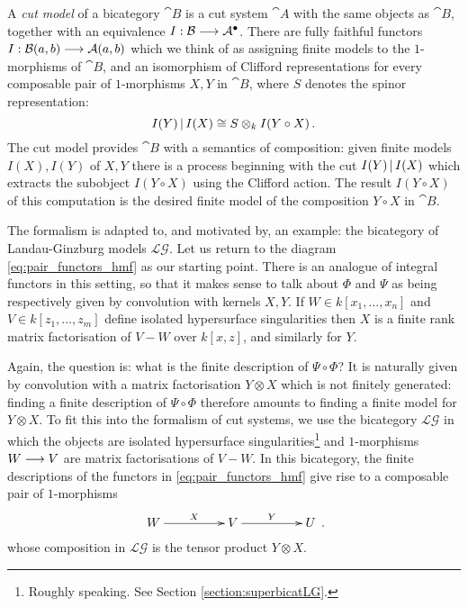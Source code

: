 \documentclass[english,letter paper,12pt,leqno]{article}
\theoremstyle{example}
\numberwithin{equation}{section}
\def\LG{\mathcal{LG}}
\begin{document}
A \emph{cut model} of a bicategory $\cat{B}$ is a cut system $\cat{A}$ with the same objects as $\cat{B}$, together with an equivalence $I: \mathcal{B} \longrightarrow \mathcal{A}^\bullet$. There are fully faithful functors $I: \mathcal{B}(a,b) \longrightarrow \mathcal{A}(a,b)$ which we think of as assigning finite models to the $1$-morphisms of $\cat{B}$, and an isomorphism of Clifford representations for every composable pair of $1$-morphisms $X,Y$ in $\cat{B}$, where $S$ denotes the spinor representation:
\begin{equation}\label{eq:intro_cut_semantics}
I(Y) \,|\, I(X) \cong S \otimes_k I( Y \circ X )\,.
\end{equation}
The cut model provides $\cat{B}$ with a semantics of composition: given finite models $I(X), I(Y)$ of $X,Y$ there is a process beginning with the cut $I(Y) \,|\, I(X)$ which extracts the subobject $I(Y \circ X)$ using the Clifford action. The result $I( Y \circ X )$ of this computation is the desired finite model of the composition $Y \circ X$ in $\cat{B}$.
\medskip

The formalism is adapted to, and motivated by, an example: the bicategory of Landau-Ginzburg models $\LG$. Let us return to the diagram \eqref{eq:pair_functors_hmf} as our starting point. There is an analogue of integral functors in this setting, so that it makes sense to talk about $\Phi$ and $\Psi$ as being respectively given by convolution with kernels $X,Y$. If $W \in k[x_1,\ldots,x_n]$ and $V \in k[z_1,\ldots,z_m]$ define isolated hypersurface singularities then $X$ is a finite rank matrix factorisation of $V - W$ over $k[x,z]$, and similarly for $Y$.

Again, the question is: what is the finite description of $\Psi \circ \Phi$? It is naturally given by convolution with a matrix factorisation $Y \otimes X$ which is not finitely generated: finding a finite description of $\Psi \circ \Phi$ therefore amounts to finding a finite model for $Y \otimes X$. To fit this into the formalism of cut systems, we use the  bicategory $\LG$ in which the objects are isolated hypersurface singularities\footnote{Roughly speaking. See Section \ref{section:superbicatLG}.} and $1$-morphisms $W \longrightarrow V$ are matrix factorisations of $V - W$. In this bicategory, the finite descriptions of the functors in \eqref{eq:pair_functors_hmf} give rise to a composable pair of $1$-morphisms
\begin{equation}\label{eq:cut_lg}
\xymatrix@C+2pc{
W \ar[r]^-{X} & V \ar[r]^-{Y} & U
}\,.
\end{equation}
whose composition in $\LG$ is the tensor product $Y \otimes X$.
\end{document}
